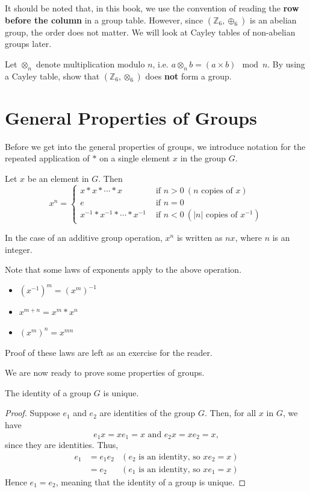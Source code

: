 It should be noted that, in this book, we use the convention of reading the \textbf{row before the column} in a group table. However, since $(\mathbb{Z}_6, \oplus_6)$ is an abelian group, the order does not matter. We will look at Cayley tables of non-abelian groups later.

\begin{exercise}
    Let $\otimes_n$ denote multiplication modulo $n$, i.e. $a \otimes_n b = (a \times b) \mod{n}$. By using a Cayley table, show that $(\mathbb{Z}_6, \otimes_6)$ does \textbf{not} form a group.
\end{exercise}

\section{General Properties of Groups}
Before we get into the general properties of groups, we introduce notation for the repeated application of $\ast$ on a single element $x$ in the group $G$.
\begin{definition}
    Let $x$ be an element in $G$. Then
    \[
        x^n =
        \begin{cases}
            x\ast x\ast \cdots \ast x & \text{ if } n > 0 \ (n\text{ copies of }x)\\
            e & \text{ if } n=0 \\
            x^{-1}\ast x^{-1}\ast \cdots \ast x^{-1} & \text{ if } n<0 \ (|n|\text{ copies of }x^{-1})
        \end{cases}
    \]
\end{definition}
\begin{remark}
    In the case of an additive group operation, $x^n$ is written as $nx$, where $n$ is an integer.
\end{remark}

Note that some laws of exponents apply to the above operation.
\begin{itemize}
    \item $\left(x^{-1}\right)^m = \left(x^m\right)^{-1}$
    \item $x^{m+n} = x^m \ast x^n$
    \item $\left(x^m\right)^n = x^{mn}$
\end{itemize}
Proof of these laws are left as an exercise for the reader.

We are now ready to prove some properties of groups.
\begin{proposition}\label{prop-identity-is-unique}
    The identity of a group $G$ is unique.
\end{proposition}
\begin{proof}
    Suppose $e_1$ and $e_2$ are identities of the group $G$. Then, for all $x$ in $G$, we have
    \[
        e_1x = xe_1 = x \text{ and } e_2x = xe_2 = x,
    \]
    since they are identities. Thus,
    \begin{align*}
        e_1 &= e_1e_2 & (e_2 \text{ is an identity, so } xe_2 = x)\\
        &= e_2 & (e_1 \text{ is an identity, so } xe_1 = x)
    \end{align*}
    Hence $e_1 = e_2$, meaning that the identity of a group is unique.
\end{proof}

